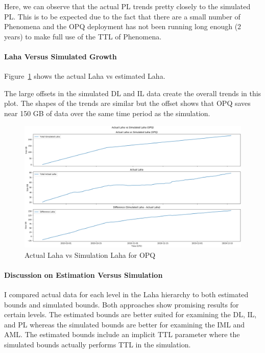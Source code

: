 Here, we can observe that the actual PL trends pretty closely to the simulated PL. This is to be expected due to the fact that there are a small number of Phenomena and the OPQ deployment has not been running long enough (2 years) to make full use of the TTL of Phenomena.

\paragraph{Laha Versus Simulated Growth}
Figure~\ref{fig:actual_laha_vs_sim_opq} shows the actual Laha vs estimated Laha.

The large offsets in the simulated DL and IL data create the overall trends in this plot. The shapes of the trends are similar but the offset shows that OPQ saves near 150 GB of data over the same time period as the simulation.

\begin{figure}[H]
    \centering
    \includegraphics[width=\linewidth]{figures/actual_laha_vs_sim_opq.png}
    \caption{Actual Laha vs Simulation Laha for OPQ}
    \label{fig:actual_laha_vs_sim_opq}
\end{figure}

\paragraph{Discussion on Estimation Versus Simulation}

I compared actual data for each level in the Laha hierarchy to both estimated bounds and simulated bounds. Both approaches show promising results for certain levels. The estimated bounds are better suited for examining the DL, IL, and PL whereas the simulated bounds are better for examining the IML and AML. The estimated bounds include an implicit TTL parameter where the simulated bounds actually performs TTL in the simulation.

